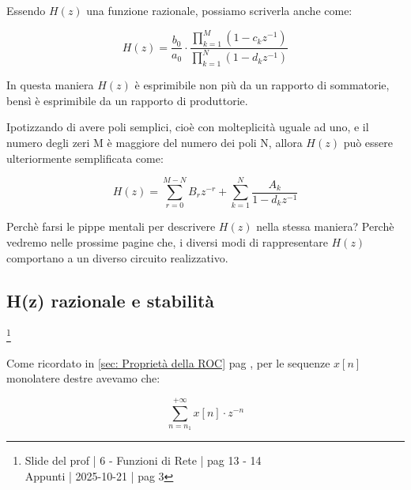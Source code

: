 Essendo $H \left(z\right)$ una funzione razionale, possiamo scriverla anche come: 

{
    \Large 
    \begin{equation}
        H \left(z\right) 
        = 
        \dfrac{b_0}{a_0}
        \cdot 
        \dfrac{\prod_{k = 1}^{M} \left( 1 - c_k z^{-1}\right)}{\prod_{k = 1}^{N} \left( 1 - d_k z^{-1}\right)}
    \end{equation}
}

In questa maniera $H \left(z\right)$ è esprimibile non più da un rapporto di sommatorie, bensì è esprimibile da un rapporto di produttorie. \newline 

Ipotizzando di avere poli semplici, cioè con molteplicità uguale ad uno, e il numero degli zeri M è maggiore del numero dei poli N, 
allora $H \left(z\right)$ può essere ulteriormente semplificata come: 

{
    \Large 
    \begin{equation}
        H \left(z\right)
        = 
        \sum_{r = 0}^{M -N}
        B_r z^{-r}
        + 
        \sum_{k = 1}^{N}
        \dfrac{A_k}{1 - d_k z^{-1}}
    \end{equation}
}

\begin{tcolorbox}
    Perchè farsi le pippe mentali per descrivere $H \left(z\right)$ nella stessa maniera? Perchè vedremo nelle prossime pagine che, 
    i diversi modi di rappresentare $H \left(z\right)$ comportano a un diverso circuito realizzativo. 
\end{tcolorbox} 

\newpage 

\subsection{H(z) razionale e stabilità}

\footnote{ 
    Slide del prof | 6 - Funzioni di Rete | pag 13 - 14\\
    Appunti | 2025-10-21 | pag 3
} 

Come ricordato in \ref{sec: Proprietà della ROC}  pag \pageref{sec: Proprietà della ROC}, 
per le sequenze $x \left[ n\right]$ monolatere destre avevamo che: 

{
    \Large 
    \begin{equation}
        \sum_{n = n_1}^{+ \infty}
        x \left[ n\right] \cdot z^{-n}
    \end{equation}
}

